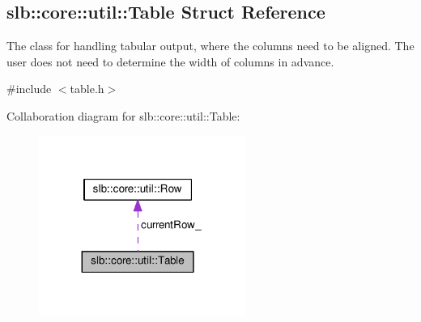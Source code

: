 \hypertarget{structslb_1_1core_1_1util_1_1Table}{}\subsection{slb\+:\+:core\+:\+:util\+:\+:Table Struct Reference}
\label{structslb_1_1core_1_1util_1_1Table}


The class for handling tabular output, where the columns need to be aligned. The user does not need to determine the width of columns in advance.  




{\ttfamily \#include $<$table.\+h$>$}



Collaboration diagram for slb\+:\+:core\+:\+:util\+:\+:Table\+:\nopagebreak
\begin{figure}[H]
\begin{center}
\leavevmode
\includegraphics[width=191pt]{structslb_1_1core_1_1util_1_1Table__coll__graph}
\end{center}
\end{figure}
